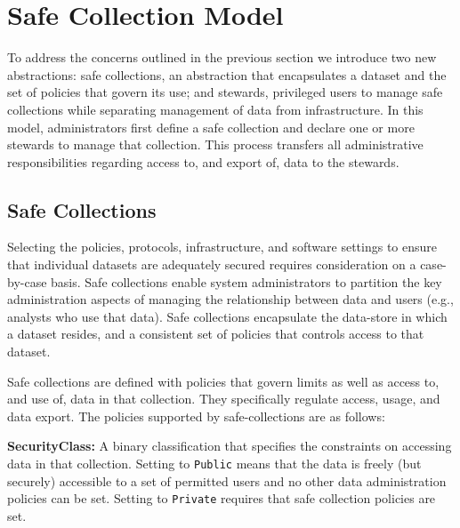 \section{Safe Collection Model}
\label{sec:architecture}


To address the concerns outlined in the previous section we introduce two
new abstractions: safe collections, an abstraction that encapsulates
a dataset and the set of policies that govern its use; and stewards, privileged users
to manage safe collections while separating management of data from infrastructure.  
In this model, administrators first define a safe collection and declare one 
or more stewards to manage that collection. This process transfers
all administrative responsibilities regarding access to, and export of, data to the stewards.

\subsection{Safe Collections}

Selecting the policies, protocols, infrastructure, and 
software settings to ensure that individual datasets are adequately secured requires consideration
on a case-by-case basis. 
Safe collections enable system administrators to partition the key administration
aspects of managing the relationship between data and users (e.g., analysts who use that data). 
Safe collections encapsulate the data-store in which a dataset resides, and a consistent set of policies
that controls access to that dataset.
 
Safe collections are defined with policies that govern limits as well as access to, and use of, 
data in that collection. They specifically regulate access, usage, and data export.
The policies supported by safe-collections are as follows: 

\textbf{SecurityClass:} A binary classification that specifies the constraints
on accessing data in that collection. Setting to \texttt{Public} means that the data is freely
(but securely) accessible to a set of permitted users and no other 
data administration policies can be set.  Setting to \texttt{Private}
requires that safe collection policies are set. 

